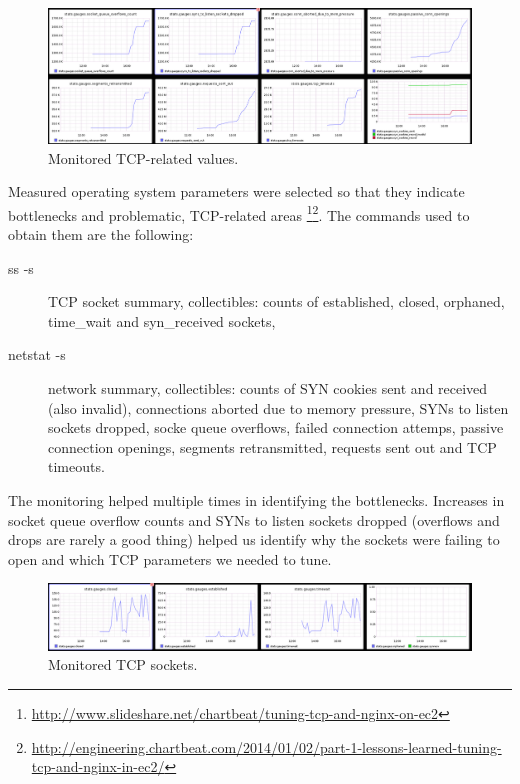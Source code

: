 \documentclass{uvamscse}
\begin{document}
\begin{figure}[H]
\centering
\includegraphics[scale=0.3]{graphitetcp}
\caption{Monitored TCP-related values.}
\label{figure:tcpstates}
\end{figure}

Measured operating system parameters were selected so that they indicate bottlenecks and problematic, TCP-related areas \footnote{\url{http://www.slideshare.net/chartbeat/tuning-tcp-and-nginx-on-ec2}}\footnote{\url{http://engineering.chartbeat.com/2014/01/02/part-1-lessons-learned-tuning-tcp-and-nginx-in-ec2/}}. The commands used to obtain them are the following:
\begin{description}
  \item [ss -s] TCP socket summary, collectibles: counts of established, closed, orphaned, time\_wait and syn\_received sockets,
  \item [netstat -s] network summary, collectibles: counts of SYN cookies sent and received (also invalid), connections aborted due to memory pressure, SYNs to listen sockets dropped, socke queue overflows, failed connection attemps, passive connection openings, segments retransmitted, requests sent out and TCP timeouts.
\end{description}

The monitoring helped multiple times in identifying the bottlenecks. Increases in socket queue overflow counts and SYNs to listen sockets dropped (overflows and drops are rarely a good thing) helped us identify why the sockets were failing to open and which TCP parameters we needed to tune.

\begin{figure}[H]
\centering
\includegraphics[scale=0.4]{graphitesocket}
\caption{Monitored TCP sockets.}
\label{figure:tcpstates}
\end{figure}
\end{document}
